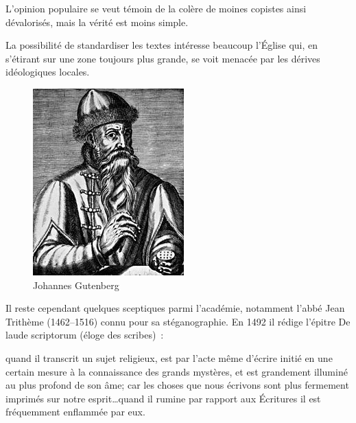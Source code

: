 \begin{minipage}[H]{0.39\linewidth}
L'opinion populaire se veut témoin de la colère de moines copistes ainsi dévalorisés, mais la vérité est moins simple. 

La possibilité de standardiser les textes intéresse beaucoup l'Église qui, en s'étirant sur une zone toujours plus grande, se voit menacée par les dérives idéologiques locales.
\vspace{1cm}
\end{minipage}
\begin{minipage}[H]{0.59\linewidth}
  \begin{figure}[H]
  \centering
  \includegraphics[height=0.15\paperheight]{../resources/illustrations/gutenberg}
  \caption{Johannes Gutenberg}
  \end{figure}
\end{minipage}

Il reste cependant quelques sceptiques parmi l'académie, notamment l'abbé Jean Trithème (1462--1516) connu pour sa stéganographie. En 1492 il rédige l'épitre \og De laude scriptorum \fg{} (éloge des scribes)~:

\begin{coolquote} quand il transcrit un sujet religieux, est par l'acte même d'écrire initié en une certain mesure à la connaissance des grands mystères, et est grandement illuminé au plus profond de son âme; car les choses que nous écrivons sont plus fermement imprimés sur notre esprit\ldots quand il rumine par rapport aux Écritures il est fréquemment enflammée par eux.
\end{coolquote}


